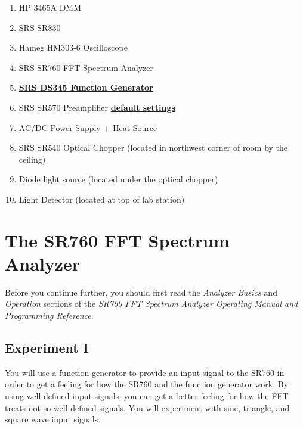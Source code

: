 \documentclass{../lab}
\begin{document}
\begin{enumerate}
    \item HP 3465A DMM

    \item SRS SR830

    \item Hameg HM303-6 Oscilloscope

    \item SRS SR760 FFT Spectrum Analyzer

    \item \href{https://youtu.be/PrM8DHFOFS0}{\textbf{SRS DS345 Function Generator}}

    \item SRS SR570 Preamplifier \href{http://experimentationlab.berkeley.edu/defaultsetting}{\textbf{default settings}}

    \item AC/DC Power Supply + Heat Source

    \item SRS SR540 Optical Chopper (located in northwest corner of room by the ceiling)

    \item Diode light source (located under the optical chopper)

    \item Light Detector (located at top of lab station)

\end{enumerate}

\section{The SR760 FFT Spectrum Analyzer}

Before you continue further, you should first read the \emph{Analyzer Basics} and \emph{Operation} sections of the \emph{SR760 FFT Spectrum Analyzer Operating Manual and Programming Reference}.

\subsection{Experiment I}

You will use a function generator to provide an input signal to the SR760 in order to get a feeling for how the SR760 and the function generator work. By using well-defined input signals, you can get a better feeling for how the FFT treats not-so-well defined signals. You will experiment with sine, triangle, and square wave input signals.
\end{document}
